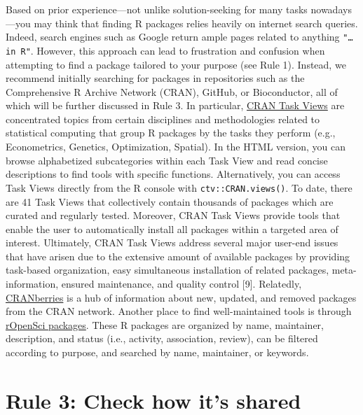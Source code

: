 \documentclass[10pt,letterpaper]{article}
\begin{document}
Based on prior experience---not unlike solution-seeking for many tasks
nowadays---you may think that finding R packages relies heavily on
internet search queries. Indeed, search engines such as Google return
ample pages related to anything \texttt{"\ldots{}in\ R"}. However, this
approach can lead to frustration and confusion when attempting to find a
package tailored to your purpose (see Rule 1). Instead, we recommend
initially searching for packages in repositories such as the
Comprehensive R Archive Network (CRAN), GitHub, or Bioconductor, all of
which will be further discussed in Rule 3. In particular,
\href{https://cran.r-project.org/web/views/}{CRAN Task Views} are
concentrated topics from certain disciplines and methodologies related
to statistical computing that group R packages by the tasks they perform
(e.g., Econometrics, Genetics, Optimization, Spatial). In the HTML
version, you can browse alphabetized subcategories within each Task View
and read concise descriptions to find tools with specific functions.
Alternatively, you can access Task Views directly from the R console
with \texttt{ctv::CRAN.views()}. To date, there are 41 Task Views that
collectively contain thousands of packages which are curated and
regularly tested. Moreover, CRAN Task Views provide tools that enable
the user to automatically install all packages within a targeted area of
interest. Ultimately, CRAN Task Views address several major user-end
issues that have arisen due to the extensive amount of available
packages by providing task-based organization, easy simultaneous
installation of related packages, meta-information, ensured maintenance,
and quality control {[}9{]}. Relatedly,
\href{http://dirk.eddelbuettel.com/cranberries/index.html}{CRANberries}
is a hub of information about new, updated, and removed packages from
the CRAN network. Another place to find well-maintained tools is through
\href{https://ropensci.org/packages/}{rOpenSci packages}. These R
packages are organized by name, maintainer, description, and status
(i.e., activity, association, review), can be filtered according to
purpose, and searched by name, maintainer, or keywords.

\hypertarget{rule-3-check-how-its-shared}{%
\section{Rule 3: Check how it's
shared}\label{rule-3-check-how-its-shared}}
\end{document}
